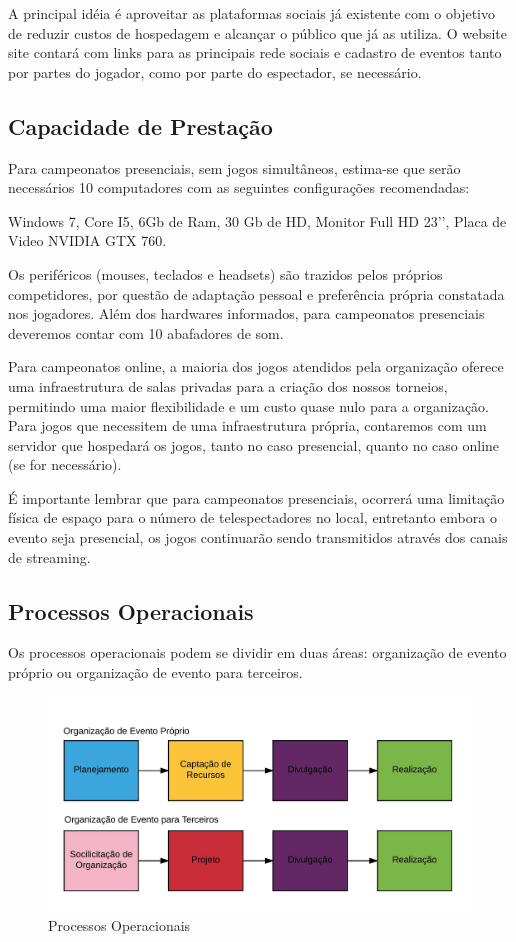 \documentclass[a4paper, 12pt]{paper}
\begin{document}
A principal idéia é aproveitar as plataformas sociais já existente com o objetivo de reduzir custos de hospedagem e alcançar o público que já as utiliza. O website site contará com links para as principais rede sociais e cadastro de eventos tanto por partes do jogador, como por parte do espectador, se necessário.
\subsection{Capacidade de Prestação}
Para campeonatos presenciais, sem jogos simultâneos, estima-se que serão necessários 10 computadores com as seguintes configurações recomendadas:

Windows 7, Core I5,  6Gb de Ram, 30 Gb de HD, Monitor Full HD 23’’, Placa de Video NVIDIA GTX 760.

Os periféricos (mouses, teclados e headsets) são trazidos pelos próprios competidores, por questão de adaptação pessoal e preferência própria constatada nos jogadores. Além dos hardwares informados, para campeonatos presenciais deveremos contar com 10 abafadores de som.

Para campeonatos online, a maioria dos jogos atendidos pela  organização oferece uma infraestrutura de salas privadas para a criação dos nossos torneios, permitindo uma maior flexibilidade e um custo quase nulo para a organização. Para jogos que necessitem de uma infraestrutura própria, contaremos com um servidor que hospedará os jogos, tanto no caso presencial, quanto no caso online (se for necessário).

É importante lembrar que para campeonatos presenciais, ocorrerá uma limitação física de espaço para o número de telespectadores no local, entretanto embora o evento seja presencial, os jogos continuarão sendo transmitidos através dos canais de streaming.
\subsection{Processos Operacionais}
Os processos operacionais podem se dividir em duas áreas: organização de evento próprio ou organização de evento para terceiros.

\begin{figure}[!ht]
    \centering
    \includegraphics[scale=0.3]{img/img10.png}
    \caption{Processos Operacionais}
\end{figure}
\end{document}
